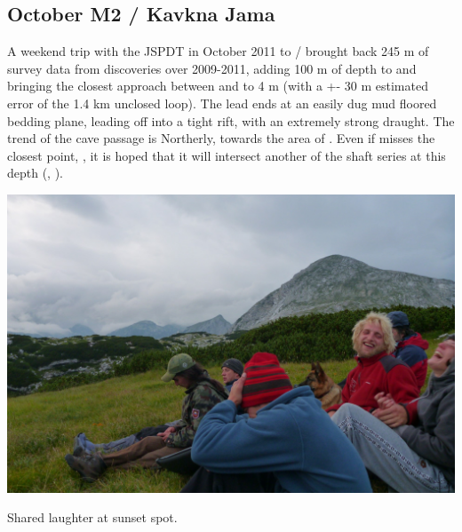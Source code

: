 \subsection{October M2 / Kavkna Jama}

A weekend trip with the JSPDT in October 2011 to /
brought back 245 m of survey data from discoveries over 2009-2011,
adding 100 m of depth to  and bringing the closest approach
between  and  to 4 m (with a +- 30 m
estimated error of the 1.4 km unclosed loop). The lead ends at an easily
dug mud floored bedding plane, leading off into a tight rift, with an
extremely strong draught. The trend of the cave passage is Northerly,
towards the  area of . Even if 
misses the closest point, , it is hoped that it will
intersect another of the  shaft series at this depth
(, ).




\begin{pagefigure}
\checkoddpage \ifoddpage \forcerectofloat \else \forceversofloat \fi
   \centering
\includegraphics[width = \textwidth]{2011/discoveries/2011-07-30-19.09.31-Grega-Panasonc DMC-FT2-028--orig.jpg}
\caption{Shared laughter at sunset spot. } \label{group sunset 2011}
\end{pagefigure}
